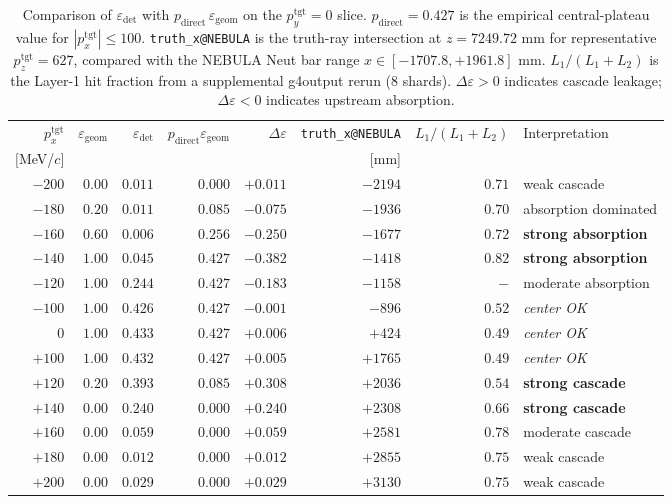 \documentclass[a4paper,11pt]{article}
\begin{document}
\begin{table}[h]
\centering
\caption{Comparison of $\varepsilon_\mathrm{det}$ with
$p_\mathrm{direct}\,\varepsilon_\mathrm{geom}$ on the $p_y^\mathrm{tgt}=0$
slice. $p_\mathrm{direct}=0.427$ is the empirical central-plateau value for
$|p_x^\mathrm{tgt}|\leq 100$. \texttt{truth\_x@NEBULA} is the truth-ray
intersection at $z=7249.72$ mm for representative $p_z^\mathrm{tgt}=627$,
compared with the NEBULA Neut bar range $x \in [-1707.8,+1961.8]$ mm.
$L_1/(L_1+L_2)$ is the Layer-1 hit fraction from a supplemental g4output rerun
(8 shards). $\Delta\varepsilon>0$ indicates cascade leakage;
$\Delta\varepsilon<0$ indicates upstream absorption.}
\label{tab:cascade_residual}
\small
\begin{tabular}{rrrrrrrl}
\toprule
$p_x^\mathrm{tgt}$ &
$\varepsilon_\mathrm{geom}$ &
$\varepsilon_\mathrm{det}$ &
$p_\mathrm{direct}\varepsilon_\mathrm{geom}$ &
$\Delta\varepsilon$ &
\texttt{truth\_x@NEBULA} &
$L_1/(L_1{+}L_2)$ &
Interpretation \\
$[$MeV/$c]$ & & & & & [mm] & & \\
\midrule
$-200$ & $0.00$ & $0.011$ & $0.000$ & $+0.011$ & $-2194$ & $0.71$ & weak cascade \\
$-180$ & $0.20$ & $0.011$ & $0.085$ & $-0.075$ & $-1936$ & $0.70$ & absorption dominated \\
$-160$ & $0.60$ & $0.006$ & $0.256$ & $-0.250$ & $-1677$ & $0.72$ & \textbf{strong absorption} \\
$-140$ & $1.00$ & $0.045$ & $0.427$ & $-0.382$ & $-1418$ & $0.82$ & \textbf{strong absorption} \\
$-120$ & $1.00$ & $0.244$ & $0.427$ & $-0.183$ & $-1158$ & $-$ & moderate absorption \\
$-100$ & $1.00$ & $0.426$ & $0.427$ & $-0.001$ & $-896$  & $0.52$ & \emph{center OK} \\
$0$    & $1.00$ & $0.433$ & $0.427$ & $+0.006$ & $+424$  & $0.49$ & \emph{center OK} \\
$+100$ & $1.00$ & $0.432$ & $0.427$ & $+0.005$ & $+1765$ & $0.49$ & \emph{center OK} \\
$+120$ & $0.20$ & $0.393$ & $0.085$ & $+0.308$ & $+2036$ & $0.54$ & \textbf{strong cascade} \\
$+140$ & $0.00$ & $0.240$ & $0.000$ & $+0.240$ & $+2308$ & $0.66$ & \textbf{strong cascade} \\
$+160$ & $0.00$ & $0.059$ & $0.000$ & $+0.059$ & $+2581$ & $0.78$ & moderate cascade \\
$+180$ & $0.00$ & $0.012$ & $0.000$ & $+0.012$ & $+2855$ & $0.75$ & weak cascade \\
$+200$ & $0.00$ & $0.029$ & $0.000$ & $+0.029$ & $+3130$ & $0.75$ & weak cascade \\
\bottomrule
\end{tabular}
\end{table}
\end{document}
